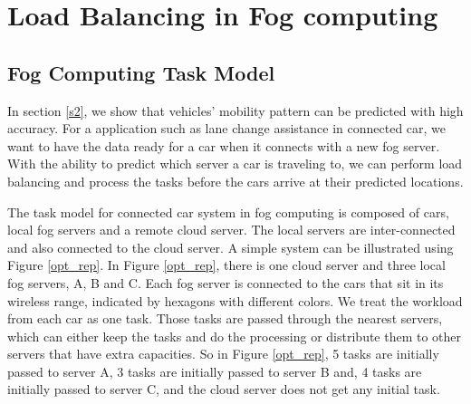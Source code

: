 \section{Load Balancing in Fog computing}



\label{s3}

\subsection{Fog Computing Task Model}
\label{Fog Computing Task Model}



In section \ref{s2}, we show that vehicles' mobility pattern can be predicted with high accuracy. For a application such as lane change assistance in connected car, we want to have the data ready for a car when it connects with a new fog server. With the ability to predict which server a car is traveling to, we can perform load balancing and process the tasks before the cars arrive at their predicted locations. 

The task model for connected car system in fog computing is composed of cars, local fog servers and a remote cloud server. The local servers are inter-connected and also connected to the cloud server. A simple system can be illustrated using Figure \ref{opt_rep}. In Figure \ref{opt_rep}, there is one cloud server and three local fog servers, A, B and C. Each fog server is connected to the cars that sit in its wireless range, indicated by hexagons with different colors. We treat the workload from each car as one task. Those tasks are passed through the nearest servers, which can either keep the tasks and do the processing or distribute them to other servers that have extra capacities. So in Figure \ref{opt_rep}, 5 tasks are initially passed to server A, 3 tasks are initially passed to server B and, 4 tasks are initially passed to server C, and the cloud server does not get any initial task.


